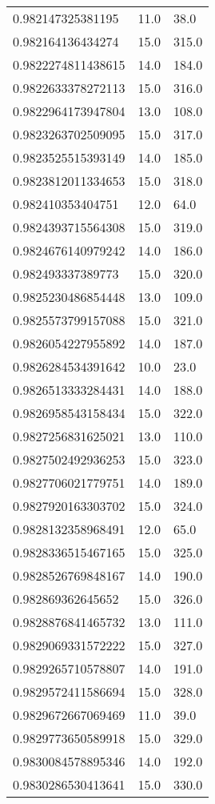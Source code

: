 \begin{center}
\begin{supertabular}[H]{p{0.30\textwidth}p{0.05\textwidth}p{0.05\textwidth}}
0.982147325381195 & 11.0 & 38.0 \\ 
0.982164136434274 & 15.0 & 315.0 \\ 
0.9822274811438615 & 14.0 & 184.0 \\ 
0.9822633378272113 & 15.0 & 316.0 \\ 
0.9822964173947804 & 13.0 & 108.0 \\ 
0.9823263702509095 & 15.0 & 317.0 \\ 
0.9823525515393149 & 14.0 & 185.0 \\ 
0.9823812011334653 & 15.0 & 318.0 \\ 
0.982410353404751 & 12.0 & 64.0 \\ 
0.9824393715564308 & 15.0 & 319.0 \\ 
0.9824676140979242 & 14.0 & 186.0 \\ 
0.982493337389773 & 15.0 & 320.0 \\ 
0.9825230486854448 & 13.0 & 109.0 \\ 
0.9825573799157088 & 15.0 & 321.0 \\ 
0.9826054227955892 & 14.0 & 187.0 \\ 
0.9826284534391642 & 10.0 & 23.0 \\ 
0.9826513333284431 & 14.0 & 188.0 \\ 
0.9826958543158434 & 15.0 & 322.0 \\ 
0.9827256831625021 & 13.0 & 110.0 \\ 
0.9827502492936253 & 15.0 & 323.0 \\ 
0.9827706021779751 & 14.0 & 189.0 \\ 
0.9827920163303702 & 15.0 & 324.0 \\ 
0.9828132358968491 & 12.0 & 65.0 \\ 
0.9828336515467165 & 15.0 & 325.0 \\ 
0.9828526769848167 & 14.0 & 190.0 \\ 
0.982869362645652 & 15.0 & 326.0 \\ 
0.9828876841465732 & 13.0 & 111.0 \\ 
0.9829069331572222 & 15.0 & 327.0 \\ 
0.9829265710578807 & 14.0 & 191.0 \\ 
0.9829572411586694 & 15.0 & 328.0 \\ 
0.9829672667069469 & 11.0 & 39.0 \\ 
0.9829773650589918 & 15.0 & 329.0 \\ 
0.9830084578895346 & 14.0 & 192.0 \\ 
0.9830286530413641 & 15.0 & 330.0 \\ 

\end{supertabular}
\end{center}
